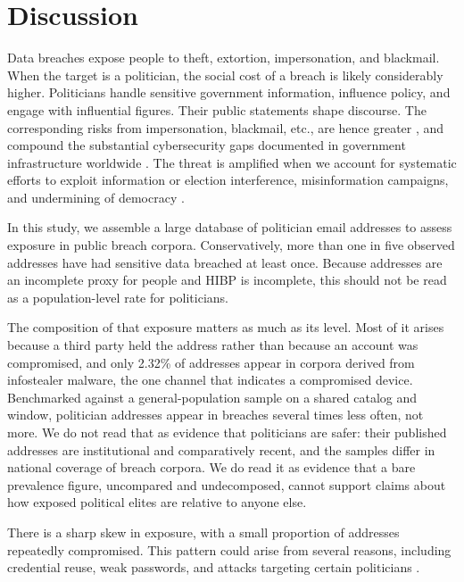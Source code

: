 \documentclass[12pt, letterpaper]{article}
\begin{document}
\section{Discussion}
Data breaches expose people to theft, extortion, impersonation, and blackmail. When the target is a politician, the social cost of a breach is likely considerably higher. Politicians handle sensitive government information, influence policy, and engage with influential figures. Their public statements shape discourse. The corresponding risks from impersonation, blackmail, etc., are hence greater \citep[for example,][]{dnc2016hack_guardian, macron2017hack, germany2019, twitterhack2020, twitterhackwitman2022}, and compound the substantial cybersecurity gaps documented in government infrastructure worldwide \citep{Ribeiro2025GIQ}. The threat is amplified when we account for systematic efforts to exploit information or election interference, misinformation campaigns, and undermining of democracy \citep{dnc2016hack_guardian, dnc2016hack_crowdstrike, macron2017hack, uk2017breach, germany2019, shires2019, norway2020, finland2020, twitterhack2020, tomz2020}.

In this study, we assemble a large database of politician email addresses to assess exposure in public breach corpora. Conservatively, more than one in five observed addresses have had sensitive data breached at least once. Because addresses are an incomplete proxy for people and HIBP is incomplete, this should not be read as a population-level rate for politicians.

The composition of that exposure matters as much as its level. Most of it arises because a third party held the address rather than because an account was compromised, and only 2.32\% of addresses appear in corpora derived from infostealer malware, the one channel that indicates a compromised device. Benchmarked against a general-population sample on a shared catalog and window, politician addresses appear in breaches several times less often, not more. We do not read that as evidence that politicians are safer: their published addresses are institutional and comparatively recent, and the samples differ in national coverage of breach corpora. We do read it as evidence that a bare prevalence figure, uncompared and undecomposed, cannot support claims about how exposed political elites are relative to anyone else.

There is a sharp skew in exposure, with a small proportion of addresses repeatedly compromised. This pattern could arise from several reasons, including credential reuse, weak passwords, and attacks targeting certain politicians \citep{dnc2016hack_guardian, macron2017hack, germany2019}.
\end{document}
